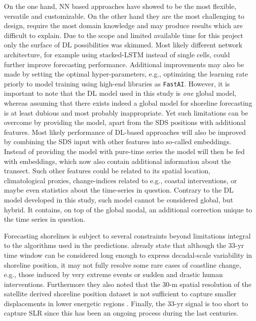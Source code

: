\documentclass[format=sigconf, review=false, screen=true]{acmart}
\begin{document}
On the one hand, NN based approaches have showed to be the most flexible, versatile and customizable. On the other hand they are the most challenging to design, require the most domain knowledge and may produce results which are difficult to explain. Due to the scope and limited available time for this project only the surface of DL possibilities was skimmed. Most likely different network architecture, for example using stacked-LSTM instead of single cells, could further improve forecasting performance. Additional improvements may also be made by setting the optimal hyper-parameters, e.g., optimizing the learning rate priorly to model training using high-end libraries as \texttt{FastAI}. However, it is important to note that the DL model used in this study is \emph{one} global model, whereas assuming that there exists indeed a global model for shoreline forecasting is at least dubious and most probably inappropriate. Yet such limitations can be overcome by providing the model, apart from the SDS positions with additional features. Most likely performance of DL-based approaches will also be improved by combining the SDS input with other features into so-called embeddings. Instead of providing the model with pure-time series the model will then be fed with embeddings, which now also contain additional information about the transect. Such other features could be related to its spatial location, climatological proxies, change-indices related to e.g., coastal interventions, or maybe even statistics about the time-series in question. Contrary to the DL model developed in this study, such model cannot be considered global, but hybrid. It contains, on top of the global modal, an additional correction unique to the time series in question. 

Forecasting shorelines is subject to several constraints beyond limitations integral to the algorithms used in the predictions. \citeauthor{vousdoukas2020sandy} already state that although the 33-yr time window can be considered long enough to express decadal-scale variability in shoreline position, it may not fully resolve some rare cases of coastline change, e.g., those induced by very extreme events or sudden and drastic human interventions. Furthermore they also noted that the 30-m spatial resolution of the satellite derived shoreline position dataset is not sufficient to capture smaller displacements in lower energetic regions \cite{vousdoukas2020sandy}. Finally, the 33-yr signal is too short to capture SLR since this has been an ongoing process during the last centuries.  
\end{document}
